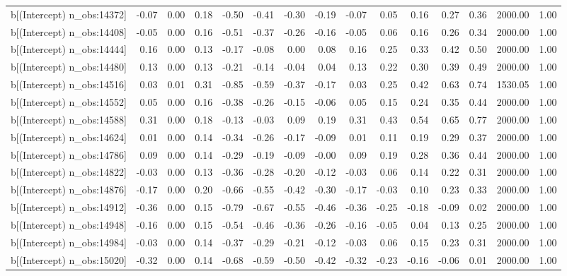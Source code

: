 \begin{table}[ht]
\begin{tabular}{rrrrrrrrrrrrrrr}
  b[(Intercept) n\_obs:14372] & -0.07 & 0.00 & 0.18 & -0.50 & -0.41 & -0.30 & -0.19 & -0.07 & 0.05 & 0.16 & 0.27 & 0.36 & 2000.00 & 1.00 \\ 
  b[(Intercept) n\_obs:14408] & -0.05 & 0.00 & 0.16 & -0.51 & -0.37 & -0.26 & -0.16 & -0.05 & 0.06 & 0.16 & 0.26 & 0.34 & 2000.00 & 1.00 \\ 
  b[(Intercept) n\_obs:14444] & 0.16 & 0.00 & 0.13 & -0.17 & -0.08 & 0.00 & 0.08 & 0.16 & 0.25 & 0.33 & 0.42 & 0.50 & 2000.00 & 1.00 \\ 
  b[(Intercept) n\_obs:14480] & 0.13 & 0.00 & 0.13 & -0.21 & -0.14 & -0.04 & 0.04 & 0.13 & 0.22 & 0.30 & 0.39 & 0.49 & 2000.00 & 1.00 \\ 
  b[(Intercept) n\_obs:14516] & 0.03 & 0.01 & 0.31 & -0.85 & -0.59 & -0.37 & -0.17 & 0.03 & 0.25 & 0.42 & 0.63 & 0.74 & 1530.05 & 1.00 \\ 
  b[(Intercept) n\_obs:14552] & 0.05 & 0.00 & 0.16 & -0.38 & -0.26 & -0.15 & -0.06 & 0.05 & 0.15 & 0.24 & 0.35 & 0.44 & 2000.00 & 1.00 \\ 
  b[(Intercept) n\_obs:14588] & 0.31 & 0.00 & 0.18 & -0.13 & -0.03 & 0.09 & 0.19 & 0.31 & 0.43 & 0.54 & 0.65 & 0.77 & 2000.00 & 1.00 \\ 
  b[(Intercept) n\_obs:14624] & 0.01 & 0.00 & 0.14 & -0.34 & -0.26 & -0.17 & -0.09 & 0.01 & 0.11 & 0.19 & 0.29 & 0.37 & 2000.00 & 1.00 \\ 
  b[(Intercept) n\_obs:14786] & 0.09 & 0.00 & 0.14 & -0.29 & -0.19 & -0.09 & -0.00 & 0.09 & 0.19 & 0.28 & 0.36 & 0.44 & 2000.00 & 1.00 \\ 
  b[(Intercept) n\_obs:14822] & -0.03 & 0.00 & 0.13 & -0.36 & -0.28 & -0.20 & -0.12 & -0.03 & 0.06 & 0.14 & 0.22 & 0.31 & 2000.00 & 1.00 \\ 
  b[(Intercept) n\_obs:14876] & -0.17 & 0.00 & 0.20 & -0.66 & -0.55 & -0.42 & -0.30 & -0.17 & -0.03 & 0.10 & 0.23 & 0.33 & 2000.00 & 1.00 \\ 
  b[(Intercept) n\_obs:14912] & -0.36 & 0.00 & 0.15 & -0.79 & -0.67 & -0.55 & -0.46 & -0.36 & -0.25 & -0.18 & -0.09 & 0.02 & 2000.00 & 1.00 \\ 
  b[(Intercept) n\_obs:14948] & -0.16 & 0.00 & 0.15 & -0.54 & -0.46 & -0.36 & -0.26 & -0.16 & -0.05 & 0.04 & 0.13 & 0.25 & 2000.00 & 1.00 \\ 
  b[(Intercept) n\_obs:14984] & -0.03 & 0.00 & 0.14 & -0.37 & -0.29 & -0.21 & -0.12 & -0.03 & 0.06 & 0.15 & 0.23 & 0.31 & 2000.00 & 1.00 \\ 
  b[(Intercept) n\_obs:15020] & -0.32 & 0.00 & 0.14 & -0.68 & -0.59 & -0.50 & -0.42 & -0.32 & -0.23 & -0.16 & -0.06 & 0.01 & 2000.00 & 1.00 \\ 

\end{tabular}
\end{table}

